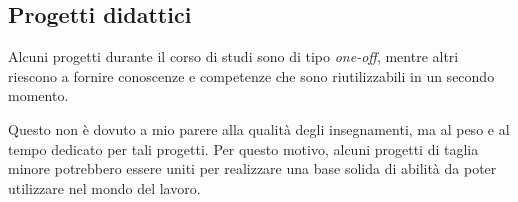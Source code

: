 \subsection{Progetti didattici}

Alcuni progetti durante il corso di studi sono di tipo \emph{one-off}, mentre
altri riescono a fornire conoscenze e competenze che sono riutilizzabili in un
secondo momento.

Questo non è dovuto a mio parere alla qualità degli insegnamenti, ma al peso e
al tempo dedicato per tali progetti. Per questo motivo, alcuni progetti di
taglia minore potrebbero essere uniti per realizzare una base solida di abilità
da poter utilizzare nel mondo del lavoro.
